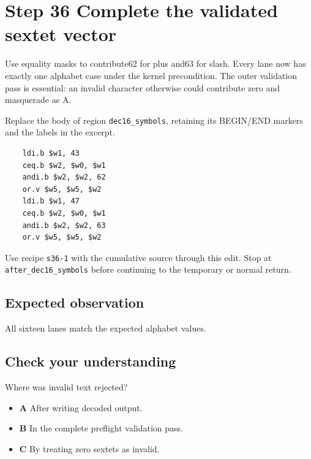 \section{Step 36 Complete the validated sextet vector}\label{base64-s36}

Use equality masks to contribute62 for plus and63 for slash. Every lane now has exactly one alphabet case under the kernel precondition. The outer validation pass is essential: an invalid character otherwise could contribute zero and masquerade as A.

Replace the body of region \texttt{dec16\_symbols}, retaining its BEGIN/END markers and the labels in the excerpt.

\begin{verbatim}
    ldi.b $w1, 43
    ceq.b $w2, $w0, $w1
    andi.b $w2, $w2, 62
    or.v $w5, $w5, $w2
    ldi.b $w1, 47
    ceq.b $w2, $w0, $w1
    andi.b $w2, $w2, 63
    or.v $w5, $w5, $w2
\end{verbatim}

Use recipe \texttt{s36-1} with the cumulative source through this edit. Stop at \texttt{after\_dec16\_symbols} before continuing to the temporary or normal return.

\subsection{Expected observation}
All sixteen lanes match the expected alphabet values.

\subsection{Check your understanding}
Where was invalid text rejected?

\begin{itemize}
  \item \textbf{A} After writing decoded output.
  \item \textbf{B} In the complete preflight validation pass.
  \item \textbf{C} By treating zero sextets as invalid.
\end{itemize}
